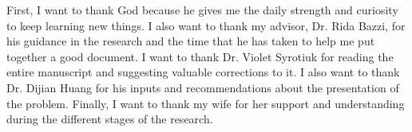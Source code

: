 \begin{acknowledgements}
   First, I want to thank God because he gives me the daily strength and curiosity to keep learning new things. I also want to thank my advisor, Dr. Rida Bazzi, for his guidance in the research and the time that he has taken to help me put together a good document.  I want to thank Dr. Violet Syrotiuk for reading the entire manuscript and suggesting valuable corrections to it. I also want to thank Dr. Dijian Huang for his inputs and recommendations about the presentation of the problem. Finally, I want to thank my wife for her support and understanding during the different stages of the research.
\end{acknowledgements}